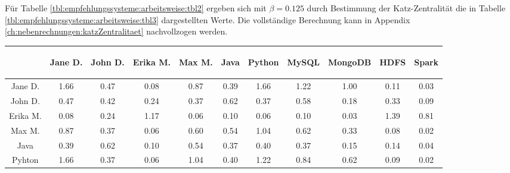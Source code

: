 
Für Tabelle \ref{tbl:empfehlungssysteme:arbeitsweise:tbl2} ergeben sich mit $\beta = 0.125$ durch Bestimmung der Katz-Zentralität die in Tabelle \ref{tbl:empfehlungssysteme:arbeitsweise:tbl3} dargestellten Werte. Die vollständige Berechnung kann in Appendix \ref{ch:nebenrechnungen:katzZentralitaet} nachvollzogen werden.
\newpage
\begin{table}[h]
	\centering
	\begin{tabular}{c|c|c|c|c|c|c|c|c|c|c}
		& \begin{sideways}Jane D.\end{sideways} & \begin{sideways}John D.\end{sideways} & \begin{sideways}Erika M.\end{sideways} & \begin{sideways}Max M.\end{sideways} & \begin{sideways}Java\end{sideways} & \begin{sideways}Python\end{sideways} & \begin{sideways}MySQL\end{sideways} & \begin{sideways}MongoDB\end{sideways} & \begin{sideways}HDFS\end{sideways} & \begin{sideways}Spark\end{sideways} \\ 
		\hline
		Jane D.  & 1.66 & 0.47 & 0.08 & 0.87 & 0.39 & 1.66 & 1.22 & 1.00 & 0.11 & 0.03\\
		John D.  & 0.47 & 0.42 & 0.24 & 0.37 & 0.62 & 0.37 & 0.58 & 0.18 & 0.33 & 0.09\\
		Erika M. & 0.08 & 0.24 & 1.17 & 0.06 & 0.10 & 0.06 & 0.10 & 0.03 & 1.39 & 0.81\\
		Max M.   & 0.87 & 0.37 & 0.06 & 0.60 & 0.54 & 1.04 & 0.62 & 0.33 & 0.08 & 0.02\\
		Java     & 0.39 & 0.62 & 0.10 & 0.54 & 0.37 & 0.40 & 0.37 & 0.15 & 0.14 & 0.04\\
		Pyhton   & 1.66 & 0.37 & 0.06 & 1.04 & 0.40 & 1.22 & 0.84 & 0.62 & 0.09 & 0.02\\

\end{tabular}
\end{table}
